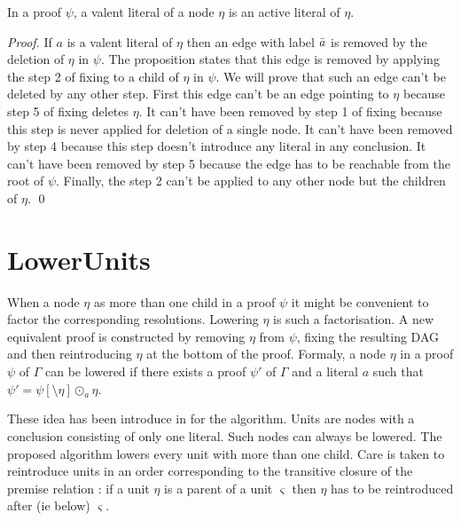 \documentclass{llncs}
\begin{document}
\begin{proposition}
In a proof $\psi$, a valent literal of a node $\eta$ is an active literal of $\eta$.
\end{proposition}

\begin{proof}
If $a$ is a valent literal of $\eta$ then an edge with label $\bar{a}$ is removed by the deletion of
$\eta$ in $\psi$. The proposition states that this edge is removed by applying the step 2 of fixing
to a child of $\eta$ in $\psi$. We will prove that such an edge can't be deleted by any other step.
First this edge can't be an edge pointing to $\eta$ because step 5 of fixing deletes $\eta$.
It can't have been removed by step 1 of fixing because this step is never applied for deletion of a
single node.
It can't have been removed by step 4 because this step doesn't introduce any literal in any conclusion.
It can't have been removed by step 5 because the edge has to be reachable from the root of $\psi$.
Finally, the step 2 can't be applied to any other node but the children
of $\eta$. \qed
\end{proof}



\section{LowerUnits}

When a node $\eta$ as more than one child in a proof $\psi$ it might be convenient to factor the
corresponding resolutions. Lowering $\eta$ is such a factorisation. A new equivalent proof is
constructed by removing $\eta$ from $\psi$, fixing the resulting DAG and then reintroducing $\eta$
at the bottom of the proof. Formaly, a node $\eta$ in a proof $\psi$ of $\Gamma$ can be lowered if
there exists a proof $\psi'$ of $\Gamma$ and a literal $a$ such that $\psi' = \psi[\setminus \eta]
\odot_a \eta$.

These idea has been introduce in \cite{LURPI} for the {\LowerUnits} algorithm. Units are nodes with a
conclusion consisting of only one literal. Such nodes can always be lowered. The proposed algorithm
lowers every unit with more than one child. Care is taken to reintroduce units in an order
corresponding to the transitive closure of the premise relation : if a unit $\eta$ is a parent of a
unit $\varsigma$ then $\eta$ has to be reintroduced after (ie below) $\varsigma$.
\end{document}
